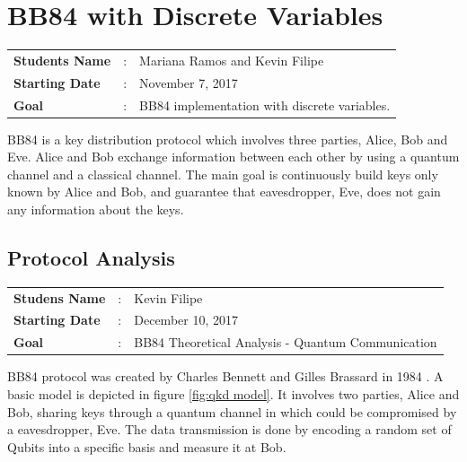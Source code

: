 \clearpage
\section{BB84 with Discrete Variables}

\begin{tcolorbox}	
\begin{tabular}{p{2.75cm} p{0.2cm} p{10.5cm}} 	
\textbf{Students Name}  &:& Mariana Ramos and Kevin Filipe\\
\textbf{Starting Date} &:& November 7, 2017\\
\textbf{Goal}          &:& BB84 implementation with discrete variables.
\end{tabular}
\end{tcolorbox}

BB84 is a key distribution protocol which involves three parties, Alice, Bob and Eve. Alice and Bob exchange information between each other by using a quantum channel and a classical channel. The main goal is continuously build keys only known by Alice and Bob, and guarantee that eavesdropper, Eve, does not gain any information about the keys.


\subsection{Protocol Analysis}
\begin{tcolorbox}	
	\begin{tabular}{p{2.75cm} p{0.2cm} p{10.5cm}} 	
		\textbf{Studens Name}  &:& Kevin Filipe\\
		\textbf{Starting Date} &:& December 10, 2017\\
		\textbf{Goal}          &:& BB84 Theoretical Analysis - Quantum Communication
	\end{tabular}
\end{tcolorbox}

BB84 protocol was created by Charles Bennett and Gilles Brassard in 1984 \cite{BB84}. A basic model is depicted in figure \ref{fig:qkd model}. It involves two parties, Alice and Bob, sharing keys through a quantum channel in which could be compromised by a eavesdropper, Eve. The data transmission is done by encoding a random set of Qubits into a specific basis and measure it at Bob. 

